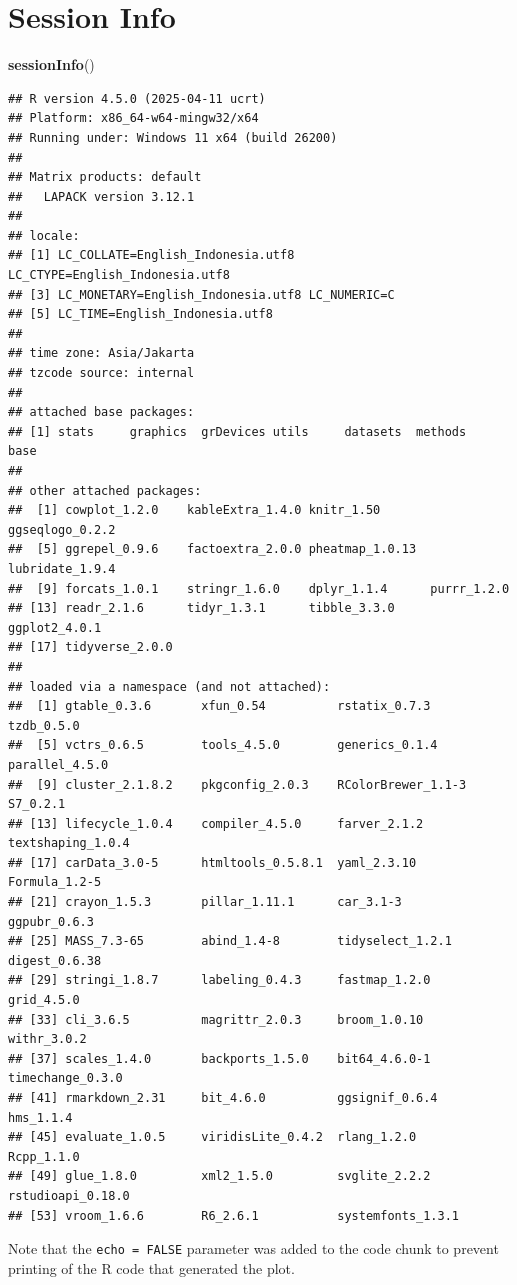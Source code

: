 \documentclass[
]{article}
\newenvironment{Shaded}{\begin{snugshade}}{\end{snugshade}}
\newcommand{\FunctionTok}[1]{\textcolor[rgb]{0.13,0.29,0.53}{\textbf{#1}}}
\newcommand{\NormalTok}[1]{#1}
\begin{document}
\section{Session Info}\label{session-info}

\begin{Shaded}
\begin{Highlighting}[]
\FunctionTok{sessionInfo}\NormalTok{()}
\end{Highlighting}
\end{Shaded}

\begin{verbatim}
## R version 4.5.0 (2025-04-11 ucrt)
## Platform: x86_64-w64-mingw32/x64
## Running under: Windows 11 x64 (build 26200)
## 
## Matrix products: default
##   LAPACK version 3.12.1
## 
## locale:
## [1] LC_COLLATE=English_Indonesia.utf8  LC_CTYPE=English_Indonesia.utf8   
## [3] LC_MONETARY=English_Indonesia.utf8 LC_NUMERIC=C                      
## [5] LC_TIME=English_Indonesia.utf8    
## 
## time zone: Asia/Jakarta
## tzcode source: internal
## 
## attached base packages:
## [1] stats     graphics  grDevices utils     datasets  methods   base     
## 
## other attached packages:
##  [1] cowplot_1.2.0    kableExtra_1.4.0 knitr_1.50       ggseqlogo_0.2.2 
##  [5] ggrepel_0.9.6    factoextra_2.0.0 pheatmap_1.0.13  lubridate_1.9.4 
##  [9] forcats_1.0.1    stringr_1.6.0    dplyr_1.1.4      purrr_1.2.0     
## [13] readr_2.1.6      tidyr_1.3.1      tibble_3.3.0     ggplot2_4.0.1   
## [17] tidyverse_2.0.0 
## 
## loaded via a namespace (and not attached):
##  [1] gtable_0.3.6       xfun_0.54          rstatix_0.7.3      tzdb_0.5.0        
##  [5] vctrs_0.6.5        tools_4.5.0        generics_0.1.4     parallel_4.5.0    
##  [9] cluster_2.1.8.2    pkgconfig_2.0.3    RColorBrewer_1.1-3 S7_0.2.1          
## [13] lifecycle_1.0.4    compiler_4.5.0     farver_2.1.2       textshaping_1.0.4 
## [17] carData_3.0-5      htmltools_0.5.8.1  yaml_2.3.10        Formula_1.2-5     
## [21] crayon_1.5.3       pillar_1.11.1      car_3.1-3          ggpubr_0.6.3      
## [25] MASS_7.3-65        abind_1.4-8        tidyselect_1.2.1   digest_0.6.38     
## [29] stringi_1.8.7      labeling_0.4.3     fastmap_1.2.0      grid_4.5.0        
## [33] cli_3.6.5          magrittr_2.0.3     broom_1.0.10       withr_3.0.2       
## [37] scales_1.4.0       backports_1.5.0    bit64_4.6.0-1      timechange_0.3.0  
## [41] rmarkdown_2.31     bit_4.6.0          ggsignif_0.6.4     hms_1.1.4         
## [45] evaluate_1.0.5     viridisLite_0.4.2  rlang_1.2.0        Rcpp_1.1.0        
## [49] glue_1.8.0         xml2_1.5.0         svglite_2.2.2      rstudioapi_0.18.0 
## [53] vroom_1.6.6        R6_2.6.1           systemfonts_1.3.1
\end{verbatim}

Note that the \texttt{echo\ =\ FALSE} parameter was added to the code
chunk to prevent printing of the R code that generated the plot.
\end{document}
